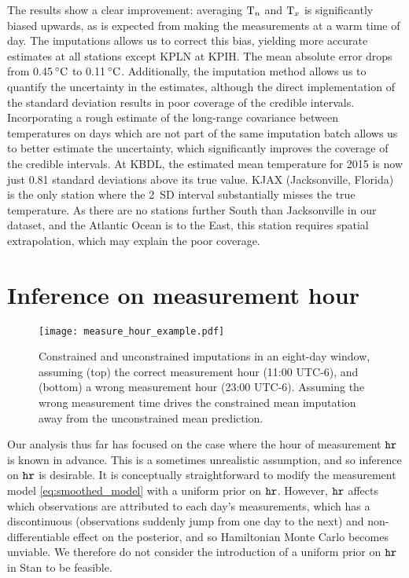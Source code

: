 The results show a clear improvement: averaging $\Tn$ and $\Tx$ is significantly biased upwards, as is expected
from making the measurements at a warm time of day.
The imputations allows us to correct this bias, yielding more accurate estimates at all stations
except KPLN at KPIH.
The mean absolute error drops from 0.45$\degreeC$ to 0.11$\degreeC$.
Additionally, the imputation method allows us to quantify the uncertainty in the estimates,
although the direct implementation of the standard deviation results in poor coverage
of the credible intervals.
Incorporating a rough estimate of the long-range covariance between
temperatures on days which are not part of the same imputation batch
allows us to better estimate the uncertainty, which significantly
improves the coverage of the credible intervals.
At KBDL, the estimated mean temperature for 2015 is now just 0.81 standard deviations above its true value.
KJAX (Jacksonville, Florida) is the only station where the 2~SD interval substantially misses the true temperature.
As there are no stations further South than Jacksonville in our dataset, and the Atlantic Ocean is to the East,
this station requires spatial extrapolation, which may explain the poor coverage.

\section{Inference on measurement hour}
\label{sec:inferhour}

\begin{figure}[tbp]
\centering
\texttt{[image: measure\_hour\_example.pdf]}
\caption{\label{fig:measure_hour_example} Constrained and unconstrained imputations in an eight-day window, assuming (top) the correct measurement hour (11:00 UTC-6), and (bottom) a wrong measurement hour (23:00 UTC-6). Assuming the wrong measurement time drives the constrained mean imputation away from the unconstrained mean prediction.}
\end{figure}

Our analysis thus far has focused on the case where the hour of measurement \(\hour\) is known in advance.
This is a sometimes unrealistic assumption, and so inference on \(\hour\) is desirable.
It is conceptually straightforward to modify the measurement model \autoref{eq:smoothed_model} with a uniform prior on \(\hour\).
However, \(\hour\) affects which observations are attributed to each day's measurements, which has a 
discontinuous (observations suddenly jump from one day to the next) and non-differentiable effect on the posterior, 
and so Hamiltonian Monte Carlo becomes unviable.
We therefore do not consider the introduction of a uniform prior on \(\hour\) in Stan to be feasible.

